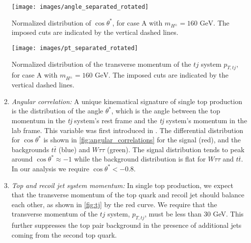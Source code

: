 \begin{enumerate}
\begin{marginfigure}[-8in]
\centering
\texttt{[image: images/angle\_separated\_rotated]}\hfill
 \caption{Normalized distribution of $\cos\theta^*$, for case A with $m_{H^{\pm}}=160\text{ GeV}$. The imposed cuts are indicated by the vertical dashed lines.}
\label{fig:angular_correlations}
\end{marginfigure}

\begin{marginfigure}[-3in]
\centering
\texttt{[image: images/pt\_separated\_rotated]}
 \caption{Normalized distribution of the transverse momentum of the $tj$ system $p_{T,tj}$, for case A with $m_{H^{\pm}}=160\text{ GeV}$. The imposed cuts are indicated by the vertical dashed lines.}
\label{fig:tj}
\end{marginfigure}

\item \emph{Angular correlation:} A unique kinematical signature of single top production is the distribution of the angle $\theta^{*}$, which is the angle between the top momentum in the \emph{tj} system's rest frame and the \emph{tj} system's momentum in the lab frame. This variable was first introduced in \cite{Kling:2012up}. The differential distribution for $\cos\theta^{*}$ is shown in \autoref{fig:angular_correlations} for the signal (red), and the backgrounds $t\bar{t}$ (blue) and $W\tau\tau$ (green). The signal distribution tends to peak around $\cos\theta^* \approx -1$ while the background distribution is flat for $W\tau\tau$ and $t\overline{t}$. In our analysis we require $\cos\theta^*< -0.8$.
 
\item\emph{Top and recoil jet system momentum:} In single top production, we expect that the transverse momentum of the top quark and recoil jet should balance each other, as shown in \autoref{fig:tj} by the red curve. We require that the transverse momentum of the $tj$ system, $p_{T,tj}$, must be less than 30 GeV. This further suppresses the top pair background in the presence of additional jets coming from the second top quark.
\end{enumerate}
